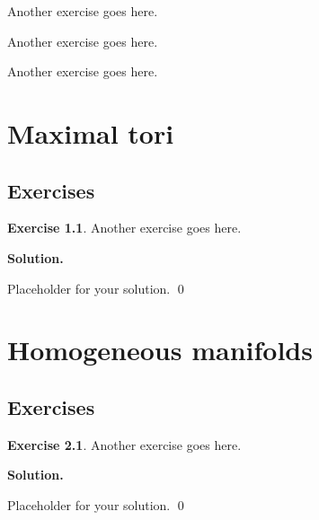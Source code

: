 \documentclass[12pt]{book}
\theoremstyle{definition}
\newtheorem{exercise}{Exercise}[chapter]
\newenvironment{solution}
{%
  \par\noindent\textbf{Solution.}\quad
}
{%
  \qed\par
}
\begin{document}
\begin{taggedexercise}[\textcolor{red}{TODO}]
  Another exercise goes here.
\end{taggedexercise}

\begin{taggedexercise}[\textcolor{red}{TODO}]
  Another exercise goes here.
\end{taggedexercise}

\begin{taggedexercise}[\textcolor{red}{TODO}]
  Another exercise goes here.
\end{taggedexercise}

\chapter{Maximal tori}
\section{Exercises}

\begin{exercise}
Another exercise goes here.
\end{exercise}

\begin{solution}
Placeholder for your solution.
\end{solution}

\chapter{Homogeneous manifolds}
\section{Exercises}

\begin{exercise}
Another exercise goes here.
\end{exercise}

\begin{solution}
Placeholder for your solution.
\end{solution}

\end{document}
